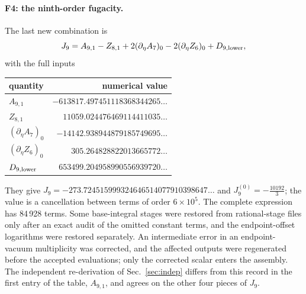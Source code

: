 \documentclass[11pt,a4paper]{article}
\numberwithin{equation}{section}
\begin{document}
\paragraph{F4: the ninth-order fugacity.} The last new combination is
\begin{equation}
 J_9=A_{9,1}-Z_{8,1}+2(\partial_\eta A_7)_0-2(\partial_\eta Z_6)_0+D_{9,\rm lower},
\end{equation}
with the full inputs
\begin{center}\small
\begin{tabular}{@{}lr@{}}
\toprule
quantity & numerical value\\
\midrule
$A_{9,1}$ & $-613817.497451118368344265\ldots$\\
$Z_{8,1}$ & $11059.024476469114411035\ldots$\\
$(\partial_\eta A_7)_0$ & $-14142.938944879185749695\ldots$\\
$(\partial_\eta Z_6)_0$ & $305.264828822013665772\ldots$\\
$D_{9,\rm lower}$ & $653499.204958990556939720\ldots$\\
\bottomrule
\end{tabular}
\end{center}
They give $J_9=-273.724515999324646514077910398647\ldots$ and $J_9^{(0)}=-\frac{10192}{3}$; the value is a cancellation
between terms of order $6\times10^5$. The complete expression has 84\,928 terms. Some base-integral stages were
restored from rational-stage files only after an exact audit of the omitted constant terms, and the endpoint-offset
logarithms were restored separately. An intermediate error in an endpoint-vacuum multiplicity was corrected, and the
affected outputs were regenerated before the accepted evaluations; only the corrected scalar enters the assembly. The
independent re-derivation of Sec.~\ref{sec:indep} differs from this record in the first entry of the table,
$A_{9,1}$, and agrees on the other four pieces of $J_9$.

\end{document}
